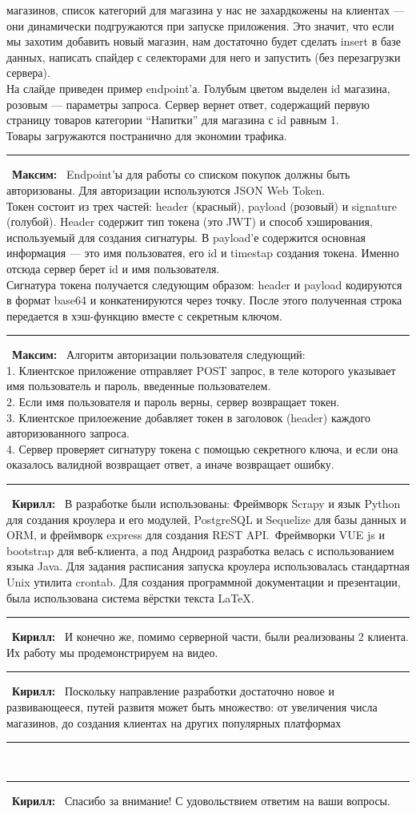 \documentclass[12pt]{article}
\newcommand{\kir}{\textbf{Кирилл: }}
\renewcommand{\max}{\textbf{Максим: }}
\renewcommand{\line}{\noindent\rule{\textwidth}{1pt}}
\begin{document}
магазинов, список категорий для магазина у нас не захардкожены на клиентах —
они динамически подгружаются при запуске приложения. Это значит, что если мы
захотим добавить новый магазин, нам достаточно будет сделать insert в базе
данных, написать спайдер с селекторами для него и запустить (без перезагрузки
сервера).\\ На слайде приведен пример endpoint'а. Голубым цветом выделен id
магазина, розовым — параметры запроса. Сервер вернет ответ, содержащий первую
страницу товаров категории ``Напитки'' для магазина с id равным 1.\\ Товары
загружаются постранично для экономии трафика.\\
\line\
\max\ Endpoint'ы для работы со списком покупок должны быть авторизованы. Для
авторизации используются JSON Web Token.\\ Токен состоит из трех частей:
header (красный), payload (розовый) и signature (голубой). Header содержит тип
токена (это JWT) и способ хэширования, используемый для создания сигнатуры.  В
payload'е содержится основная информация — это имя пользоватея, его id и
timestap создания токена. Именно отсюда сервер берет id и имя пользователя.\\
Сигнатура токена получается следующим образом: header и payload кодируются в
формат base64 и конкатенируются через точку. После этого полученная строка
передается в хэш-функцию вместе с секретным ключом.\\
\line\
\max\ Алгоритм авторизации пользователя следующий:\\
1. Клиентское приложение отправляет POST запрос, в теле которого указывает имя
пользователь и пароль, введенные пользователем.\\
2. Если имя пользователя и пароль верны, сервер возвращает токен.\\
3. Клиентское прилоежение добавляет токен в заголовок (header) каждого авторизованного запроса.\\
4. Сервер проверяет сигнатуру токена с помощью секретного ключа, и если она
оказалось валидной возвращает ответ, а иначе возвращает ошибку.\\
\line\
\kir\ В разработке были использованы: Фреймворк Scrapy и язык Python для
создания кроулера и его модулей, PostgreSQL и Sequelize для базы данных и ORM,
и фреймворк express для создания REST API.\ Фреймворки VUE js и bootstrap для
веб-клиента, а под Андроид разработка велась с использованием языка Java.  Для
задания расписания запуска кроулера использовалась стандартная Unix утилита
crontab. Для создания программной документации и презентации, была использована
система вёрстки текста {\LaTeX}.\\
\line\
\kir\ И конечно же, помимо серверной части, были реализованы 2 клиента. Их работу мы продемонстрируем на видео.\\
\line\
\kir\ Поскольку направление разработки достаточно новое и развивающееся, путей развитя может быть множество: от увеличения числа магазинов, до создания клиентах на других популярных платформах\\
\line\
\line\
\kir\ Спасибо за внимание! С удовольствием ответим на ваши вопросы.
\end{document}
